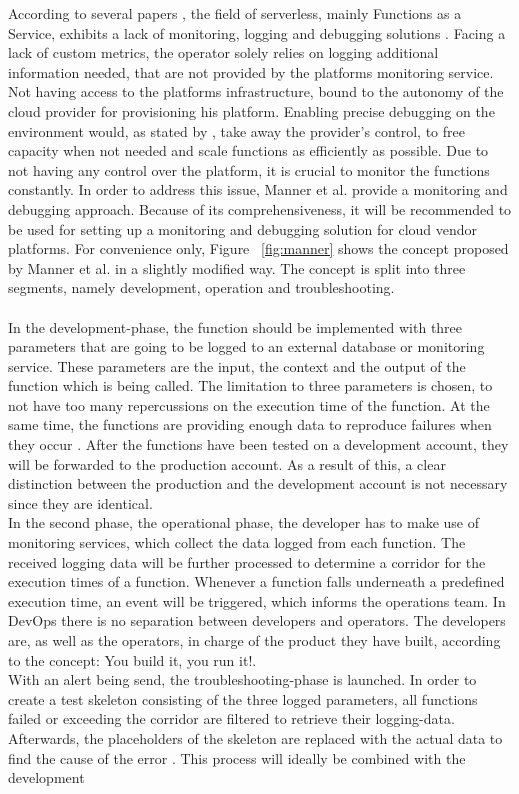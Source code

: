\documentclass[a4paper,11pt, pagesize]{scrartcl}
\begin{document}
\begin{spacing}{1.2}
According to several papers \cite{roberts2017serverless} \cite{baldini2017serverless}, the field of serverless, mainly Functions as a Service, exhibits a lack of monitoring, logging and debugging solutions \cite{kritikos2018review}. Facing a lack of custom metrics, the operator solely relies on logging additional information needed, that are not provided by the platforms monitoring service. Not having access to the platforms infrastructure, bound to the autonomy of the cloud provider for provisioning his platform. Enabling precise debugging on the environment would, as stated by \cite{manner2019troubleshooting}, take away the provider's control, to free capacity when not needed and scale functions as efficiently as possible. Due to not having any control over the platform, it is crucial to monitor the functions constantly. In order to address this issue, Manner et al. provide a monitoring and debugging approach. Because of its comprehensiveness, it will be recommended to be used for setting up a monitoring and debugging solution for cloud vendor platforms. For convenience only, Figure ~\ref{fig:manner} shows the concept proposed by Manner et al. in a slightly modified way. The concept is split into three segments, namely development, operation and troubleshooting.\\\\ In the development-phase, the function should be implemented with three parameters that are going to be logged to an external database or monitoring service. These parameters are the input, the context and the output of the function which is being called. The limitation to three parameters is chosen, to not have too many repercussions on the execution time of the function. At the same time, the functions are providing enough data to reproduce failures when they occur \cite{manner2019troubleshooting}. After the functions have been tested on a development account, they will be forwarded to the production account. As a result of this, a clear distinction between the production and the development account is not necessary since they are identical. \\ In the second phase, the operational phase, the developer has to make use of monitoring services, which collect the data logged from each function. The received logging data will be further processed to determine a corridor for the execution times of a function. Whenever a function falls underneath a predefined execution time, an event will be triggered, which informs the operations team. In DevOps there is no separation between developers and operators. The developers are, as well as the operators, in charge of the product they have built, according to the concept: \glqq You build it, you run it!\grqq{}.\\ With an alert being send, the troubleshooting-phase is launched. In order to create a test skeleton consisting of the three logged parameters, all functions failed or exceeding the corridor are filtered to retrieve their logging-data. Afterwards, the placeholders of the skeleton are replaced with the actual data to find the cause of the error \cite{manner2019troubleshooting}. This process will ideally be combined with the development 
\end{spacing}
\end{document}
